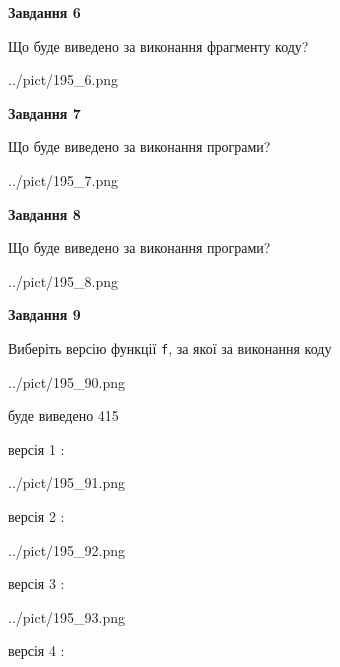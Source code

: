 \documentclass[12pt, ukrainian]{article}
\def\code#1{\Verb!#1!}
\begin{document}
{\begin {large}
{\begin {center}\textbf{Завдання 6}\end {center}}

Що буде виведено за виконання фрагменту коду?\par
\begin{center}
	{../pict/195_6.png}
\end{center}
\newpage

{\begin {center}\textbf{Завдання 7}\end {center}}

Що буде виведено за виконання програми?\par
\begin{center}
	{../pict/195_7.png}
\end{center}
\newpage

{\begin {center}\textbf{Завдання 8}\end {center}}

Що буде виведено за виконання програми?\par
\begin{center}
	{../pict/195_8.png}
\end{center}
\newpage

{\begin {center}\textbf{Завдання 9}\end {center}}

Виберіть версію функції \code{f}, за якої за виконання коду
\begin{center}
	{../pict/195_90.png}
\end{center}
буде виведено 415

\vspace{5mm}
версія 1 :

\begin{center}
	{../pict/195_91.png}
\end{center}
версія 2 :

\begin{center}
	{../pict/195_92.png}
\end{center}
версія 3 :

\begin{center}
	{../pict/195_93.png}
\end{center}
версія 4 :


\end{large}}
\end{document}
